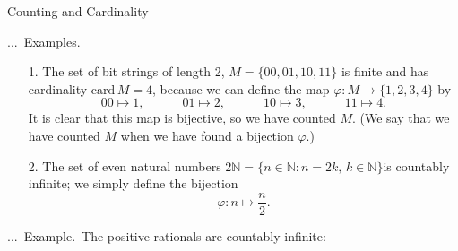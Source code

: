 \documentclass[smaller,hyperref={CJKbookmarks=true}]{beamer}
\newcommand{\N}{\mathbb{N}} \newcommand{\Z}{\mathbb{Z}} \newcommand{\Q}{\mathbb{Q}}
\newcounter{zhuo}[subsection]
\renewcommand{\thezhuo}{\thesection.\thesubsection.\arabic{zhuo}}
\newenvironment{EXAMPLE}{\stepcounter{zhuo}\alert{\!\thezhuo.~Example.\,}}{}
\newenvironment{EXAMPLES}{\stepcounter{zhuo}\alert{\!\thezhuo.~Examples.\,}}{}
\begin{document}
\begin{frame}{Counting and Cardinality}
\begin{spacing}{1.1}
\begin{EXAMPLES}
\begin{itemize}
  \item[1.] The set of bit strings of length 2, $M=\{00,01,10,11\}$ is finite and has cardinality $\text{card}\,M=4$, because we can define the map $\varphi\!:M\rightarrow\{1,2,3,4\}$ by
      \[00\mapsto1,\qquad\quad01\mapsto2,\qquad\quad
      10\mapsto3,\qquad\quad11\mapsto4.\]
      It is clear that this map is bijective, so we have counted $M$. (We say that we have counted $M$ when we have found a bijection $\varphi$.)
  \item[2.] The set of even natural numbers $2\N=\{n\in\N\!:n=2k,\,k\in\N\}$is countably infinite; we simply define the bijection
      \[\varphi\!:n\mapsto\frac{n}{2}.\]
\end{itemize}
\end{EXAMPLES}
\newpage
\begin{EXAMPLE}
The positive rationals are countably infinite:
\begin{center}
\end{center}
\end{EXAMPLE}
\end{spacing}
\end{frame}
\end{document}
